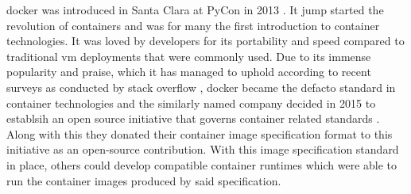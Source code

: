 \Gls{docker} was introduced in Santa Clara at PyCon in 2013 \cite{pycon2013} . It jump started the revolution of \glspl{container} and was for many the first introduction to \gls{container} technologies. It was loved by developers for its portability and speed compared to traditional \gls{vm} deployments that were commonly used. Due to its immense popularity and praise, which it has managed to uphold according to recent surveys as conducted by stack overflow \cite{stack-overflow-survey}, \gls{docker} became the defacto standard in \gls{container} technologies and the similarly named company decided in 2015 to establsih an open source initiative that governs \gls{container} related standards \cite{open-container-standard}. Along with this they donated their container image specification format \cite{open-container-standard-image-spec} to this initiative as an open-source contribution. With this image specification standard in place, others could develop compatible container runtimes which were able to run the container images produced by said specification.
